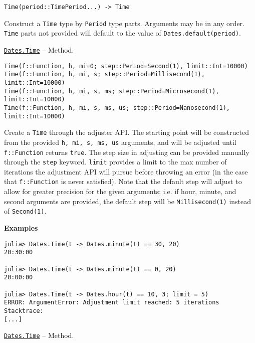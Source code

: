 \begin{adjustwidth}{2em}{0pt}


\begin{verbatim}
Time(period::TimePeriod...) -> Time
\end{verbatim}

Construct a \texttt{Time} type by \texttt{Period} type parts. Arguments may be in any order. \texttt{Time} parts not provided will default to the value of \texttt{Dates.default(period)}.



\end{adjustwidth}
\hypertarget{12024310141073288773}{}
\hyperlink{12024310141073288773}{\texttt{Dates.Time}}  -- {Method.}

\begin{adjustwidth}{2em}{0pt}


\begin{verbatim}
Time(f::Function, h, mi=0; step::Period=Second(1), limit::Int=10000)
Time(f::Function, h, mi, s; step::Period=Millisecond(1), limit::Int=10000)
Time(f::Function, h, mi, s, ms; step::Period=Microsecond(1), limit::Int=10000)
Time(f::Function, h, mi, s, ms, us; step::Period=Nanosecond(1), limit::Int=10000)
\end{verbatim}

Create a \texttt{Time} through the adjuster API. The starting point will be constructed from the provided \texttt{h, mi, s, ms, us} arguments, and will be adjusted until \texttt{f::Function} returns \texttt{true}. The step size in adjusting can be provided manually through the \texttt{step} keyword. \texttt{limit} provides a limit to the max number of iterations the adjustment API will pursue before throwing an error (in the case that \texttt{f::Function} is never satisfied). Note that the default step will adjust to allow for greater precision for the given arguments; i.e. if hour, minute, and second arguments are provided, the default step will be \texttt{Millisecond(1)} instead of \texttt{Second(1)}.

\textbf{Examples}


\begin{verbatim}
julia> Dates.Time(t -> Dates.minute(t) == 30, 20)
20:30:00

julia> Dates.Time(t -> Dates.minute(t) == 0, 20)
20:00:00

julia> Dates.Time(t -> Dates.hour(t) == 10, 3; limit = 5)
ERROR: ArgumentError: Adjustment limit reached: 5 iterations
Stacktrace:
[...]
\end{verbatim}



\end{adjustwidth}
\hypertarget{12276226804029079320}{}
\hyperlink{12276226804029079320}{\texttt{Dates.Time}}  -- {Method.}

